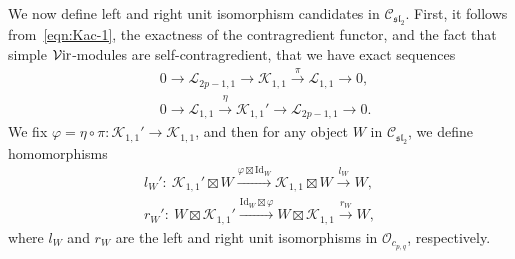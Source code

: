 \documentclass[pdftex]{sigma}
\numberwithin{equation}{section}
\theoremstyle{definition}
\begin{document}
We now define left and right unit isomorphism candidates in $\mathcal{C}_{\mathfrak{sl}_2}$.
First, it follows from~\eqref{eqn:Kac-1}, the exactness of the contragredient functor, and the fact that simple $\mathcal{V}{\rm ir}$-modules are self-contragredient, that we have exact sequences
\begin{align}
& 0\longrightarrow\mathcal{L}_{2p-1,1}\longrightarrow\mathcal{K}_{1,1}\xrightarrow{ \pi }\mathcal{L}_{1,1}\longrightarrow 0,\nonumber\\
& 0\longrightarrow\mathcal{L}_{1,1}\xrightarrow{ \eta }\mathcal{K}_{1,1}'\longrightarrow\mathcal{L}_{2p-1,1}\longrightarrow 0. \label{eqn:K11-K11'-exact-seq}
\end{align}
We fix $\varphi=\eta\circ\pi\colon \mathcal{K}_{1,1}'\rightarrow\mathcal{K}_{1,1}$, and then for any object $W$ in $\mathcal{C}_{\mathfrak{sl}_2}$, we define homomorphisms
\begin{gather}
l_W'\colon \ \mathcal{K}_{1,1}'\boxtimes W\xrightarrow{\varphi\boxtimes\mathrm{Id}_W} \mathcal{K}_{1,1}\boxtimes W\xrightarrow{l_W} W,\nonumber\\
 r_W'\colon \ W\boxtimes\mathcal{K}_{1,1}' \xrightarrow{\mathrm{Id}_W\boxtimes\varphi} W\boxtimes\mathcal{K}_{1,1}\xrightarrow{r_W} W,\label{eqn:ln'-rn'-def}
\end{gather}
where $l_W$ and $r_W$ are the left and right unit isomorphisms in $\mathcal{O}_{c_{p,q}}$, respectively.
\end{document}
